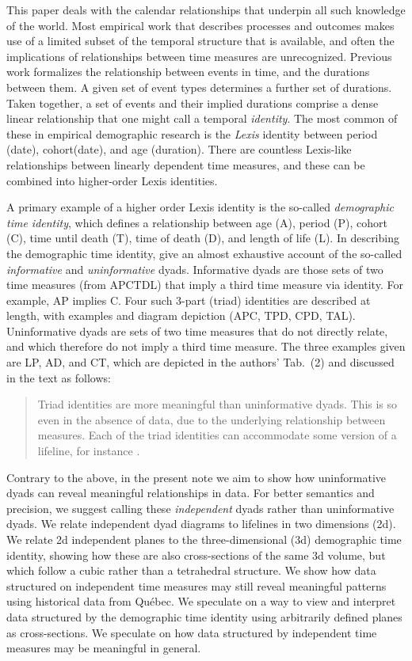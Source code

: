 \documentclass{bmcart}
\begin{document}
This paper deals with the calendar relationships that underpin all such knowledge of the world. Most empirical work that describes processes and outcomes makes use of a limited subset of the temporal structure that is available, and often the implications of relationships between time measures are unrecognized. Previous work \citep{riffe2017demographictime} formalizes the relationship between events in time, and the durations between them. A given set of event types determines a further set of durations. Taken together, a set of events and their implied durations comprise a dense linear relationship that one might call a temporal \emph{identity}. The most common of these in empirical demographic research is the \emph{Lexis} identity between period (date), cohort(date), and age (duration). There are countless Lexis-like relationships between linearly dependent time measures, and these can be combined into higher-order Lexis identities. 

A primary example of a higher order Lexis identity is the so-called \emph{demographic time identity}, which defines a relationship between age (A), period (P), cohort (C), time until death (T), time of death (D), and length of life (L). In describing the demographic time identity, \citet{riffe2017demographictime} give an almost exhaustive account of the so-called \emph{informative} and \emph{uninformative} dyads. Informative dyads are those sets of two time measures (from APCTDL) that imply a third time measure via identity. For example, AP implies C. Four such 3-part (triad) identities are described at length, with examples and diagram depiction (APC, TPD, CPD, TAL). Uninformative dyads are sets of two time measures that do not directly relate, and which therefore do not imply a third time measure. The three examples given are LP, AD, and CT, which are depicted in the authors' Tab.~(2) and discussed in the text as follows:
\begin{quote}
Triad identities are more meaningful than uninformative dyads. This is so even in the absence of data, due to the underlying relationship between measures. Each of the triad identities can accommodate some version of a lifeline, for instance \citep[p5][]{riffe2017demographictime}. 
\end{quote}

Contrary to the above, in the present note we aim to show how uninformative dyads can reveal meaningful relationships in data. For better semantics and precision, we suggest calling these \emph{independent} dyads rather than uninformative dyads. We relate independent dyad diagrams to lifelines in two dimensions (2d). We relate 2d independent planes to the three-dimensional (3d) demographic time identity, showing how these are also cross-sections of the same 3d volume, but which follow a cubic rather than a tetrahedral structure. We show how data structured on independent time measures may still reveal meaningful patterns using historical data from Qu\'{e}bec. We speculate on a way to view and interpret data structured by the demographic time identity using arbitrarily defined planes as cross-sections. We speculate on how data structured by independent time measures may be meaningful in general.
\end{document}
